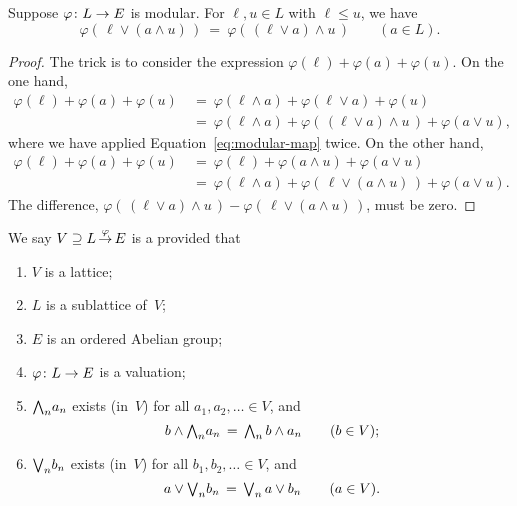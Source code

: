 \documentclass[main.tex]{subfiles}
\begin{document}
%
%
\begin{lem}
\label{L:modular-map-modular}
Suppose $\varphi\colon L \rightarrow E$ is modular.
For $\ell,u\in L$ with $\ell\leq u$, we have
\begin{equation}
\label{eq:modular-map}
\varphi(\,\ell \vee (a \wedge u)\,) 
\ =\ 
\varphi(\,(\ell\vee a)\wedge u\,)
\qquad (a\in L).
\end{equation}
\begin{proof}
The trick is to consider the expression 
$\varphi(\ell) + \varphi(a) + \varphi(u)$.
On the one hand,
\begin{align*}
\varphi(\ell) + \varphi(a) + \varphi(u)
\ &=\ \varphi(\ell\wedge a) + \varphi(\ell \vee a) + \varphi(u) \\
\ &=\ \varphi(\ell \wedge a)
      + \varphi(\,(\ell\vee a)\wedge u\,)
      + \varphi(a\vee u),
\end{align*}
where we have applied Equation~\eqref{eq:modular-map} twice.
On the other hand,
\begin{align*}
\varphi(\ell) + \varphi(a) + \varphi(u)
\ &=\ \varphi(\ell) + \varphi(a\wedge u) + \varphi(a \vee u) \\
\ &=\ \varphi(\ell \wedge a)
      + \varphi(\,\ell\vee (a\wedge u)\,)
      + \varphi(a\vee u).
\end{align*}
The difference,
$\varphi(\,(\ell\vee a)\wedge u\,)
- \varphi(\,\ell\vee (a\wedge u)\,)$,
must be zero.
\end{proof}
\end{lem}

%
%
\begin{dfn}
We say $V \supseteq L\,\smash{\stackrel{\varphi}{\rightarrow}}\,E$
 is a 
provided that
\begin{enumerate}
\item
$V$ is a lattice;
\item
$L$ is a sublattice of~$V$;
\item
$E$ is an ordered Abelian group;
\item 
$\varphi\colon L\rightarrow E$ is a valuation;
\item
$\textstyle{\bigwedge}_n a_n$ exists (in~$V$) for all $a_1, a_2, \dotsc\in V$,
and
\begin{equation*}
 b \wedge \textstyle{\bigwedge}_n a_n
\,=\,
\textstyle{\bigwedge}_n\, b\wedge a_n
\qquad(b\in V);
\end{equation*}

\item
$\textstyle{\bigvee}_n b_n$ exists (in~$V$) for all $b_1, b_2,  \dotsc\in V$,
and 
\begin{equation*}
 a \vee \textstyle{\bigvee}_n b_n
\,=\,
\textstyle{\bigvee}_n\, a\vee b_n
\qquad(a\in V).
\end{equation*}
\end{enumerate}
\end{dfn}
\end{document}
